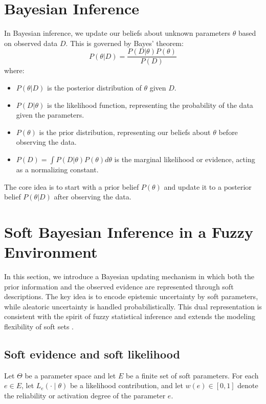 \documentclass[twoside]{article}
\begin{document}
\section{Bayesian Inference} \label{subsec:bayesian_inference}
In Bayesian inference, we update our beliefs about unknown parameters $\theta$ based on observed data $D$. This is governed by Bayes' theorem:
$$ P(\theta | D) = \frac{P(D | \theta) P(\theta)}{P(D)} $$
where:
\begin{itemize}
    \item $P(\theta | D)$ is the posterior distribution of $\theta$ given $D$.
    \item $P(D | \theta)$ is the likelihood function, representing the probability of the data given the parameters.
    \item $P(\theta)$ is the prior distribution, representing our beliefs about $\theta$ before observing the data.
    \item $P(D) = \int P(D | \theta) P(\theta) d\theta$ is the marginal likelihood or evidence, acting as a normalizing constant.
\end{itemize}
The core idea is to start with a prior belief $P(\theta)$ and update it to a posterior belief $P(\theta | D)$ after observing the data.

\section{Soft Bayesian Inference in a Fuzzy Environment}
\label{sec:soft_bayes}

In this section, we introduce a Bayesian updating mechanism in which both the prior information and the observed evidence are represented through soft descriptions. The key idea is to encode epistemic uncertainty by soft parameters, while aleatoric uncertainty is handled probabilistically. This dual representation is consistent with the spirit of fuzzy statistical inference \cite{denoeux:1999} and extends the modeling flexibility of soft sets \cite{molodtsov:1999}.

\subsection{Soft evidence and soft likelihood}

Let $\Theta$ be a parameter space and let $E$ be a finite set of soft parameters. For each $e \in E$, let $L_e(\cdot \mid \theta)$ be a likelihood contribution, and let $w(e)\in[0,1]$ denote the reliability or activation degree of the parameter $e$.
\end{document}
